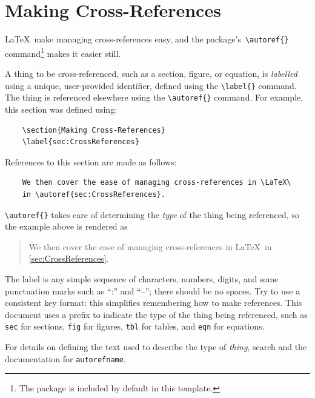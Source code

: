 \section{Making Cross-References}
\label{sec:CrossReferences}

\LaTeX\ make managing cross-references easy, and the 
package's\ \verb+\autoref{}+ command\footnote{%
    The  package is included by default in this
    template.}
makes it easier still. 

A thing to be cross-referenced, such as a section, figure, or equation,
is \emph{labelled} using a unique, user-provided identifier, defined
using the \verb+\label{}+ command.  
The thing is referenced elsewhere using the \verb+\autoref{}+ command.
For example, this section was defined using:
\begin{lstlisting}
    \section{Making Cross-References}
    \label{sec:CrossReferences}
\end{lstlisting}
References to this section are made as follows:
\begin{lstlisting}
    We then cover the ease of managing cross-references in \LaTeX\
    in \autoref{sec:CrossReferences}.
\end{lstlisting}
\verb+\autoref{}+ takes care of determining the \emph{type} of the 
thing being referenced, so the example above is rendered as
\begin{quote}
    We then cover the ease of managing cross-references in \LaTeX\
    in \autoref{sec:CrossReferences}.
\end{quote}

The label is any simple sequence of characters, numbers, digits,
and some punctuation marks such as ``:'' and ``--''; there should
be no spaces.  Try to use a consistent key format: this simplifies
remembering how to make references.  This document uses a prefix
to indicate the type of the thing being referenced, such as \texttt{sec}
for sections, \texttt{fig} for figures, \texttt{tbl} for tables,
and \texttt{eqn} for equations.

For details on defining the text used to describe the type
of \emph{thing}, search  and the 
documentation for \texttt{autorefname}.


